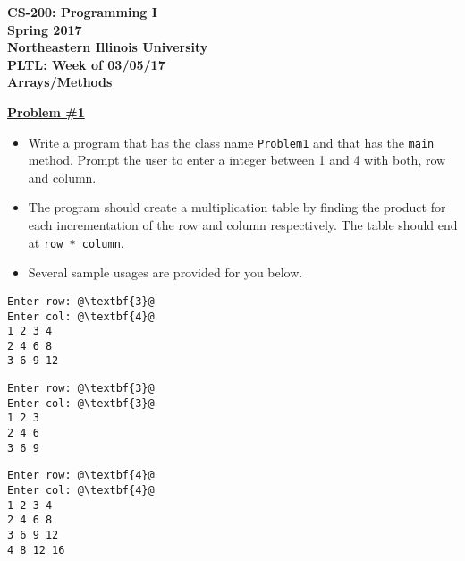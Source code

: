 \documentclass[12pt]{article}
\begin{document}
\begin{center}
	\textbf{CS-200: Programming I}\\
	\textbf{Spring 2017}\\
	\textbf{Northeastern Illinois University}\\
	\textbf{PLTL: Week of 03/05/17}\\
	\textbf{Arrays/Methods}
\end{center}


\noindent\underline{\textbf{Problem \#1}}
\begin{itemize}
	\item Write a program that has the class name \texttt{Problem1} and that has the \texttt{main} method. Prompt the user to enter a integer between 1 and 4 with both, row and column.
	\item The program should create a multiplication table by finding the product for each incrementation of the row and column respectively. The table should end at \texttt{row * column}.
	\item Several sample usages are provided for you below. 
\end{itemize}
\begin{center}
\begin{minipage}{3cm}
\begin{lstlisting}[escapechar=@]
Enter row: @\textbf{3}@
Enter col: @\textbf{4}@
1 2 3 4 
2 4 6 8 
3 6 9 12 
\end{lstlisting}
\end{minipage}
\hspace*{.5cm}
\begin{minipage}{3cm}
\begin{lstlisting}[escapechar=@]
Enter row: @\textbf{3}@
Enter col: @\textbf{3}@
1 2 3 
2 4 6 
3 6 9
\end{lstlisting}
\end{minipage}
\hspace*{.5cm}
\begin{minipage}{3cm}
\begin{lstlisting}[escapechar=@]
Enter row: @\textbf{4}@
Enter col: @\textbf{4}@
1 2 3 4 
2 4 6 8 
3 6 9 12 
4 8 12 16 
\end{lstlisting}

\end{minipage}\\


\end{center}
\end{document}
